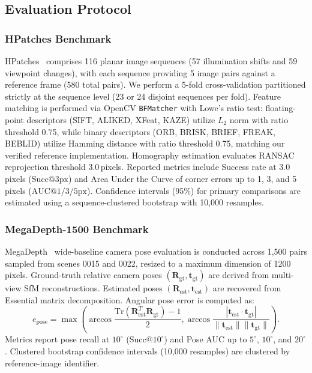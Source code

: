 \documentclass[conference]{IEEEtran}
\begin{document}
\subsection{Evaluation Protocol}
\subsubsection{HPatches Benchmark}
HPatches~\cite{balntas2017hpatches} comprises 116 planar image sequences (57 illumination shifts and 59 viewpoint changes), with each sequence providing 5 image pairs against a reference frame (580 total pairs). We perform a 5-fold cross-validation partitioned strictly at the sequence level (23 or 24 disjoint sequences per fold). Feature matching is performed via OpenCV \texttt{BFMatcher} with Lowe's ratio test: floating-point descriptors (SIFT, ALIKED, XFeat, KAZE) utilize $L_2$ norm with ratio threshold 0.75, while binary descriptors (ORB, BRISK, BRIEF, FREAK, BEBLID) utilize Hamming distance with ratio threshold 0.75, matching our verified reference implementation. Homography estimation evaluates RANSAC reprojection threshold 3.0\,pixels. Reported metrics include Success rate at 3.0\,pixels ($\text{Succ}@3\text{px}$) and Area Under the Curve of corner errors up to 1, 3, and 5 pixels ($\text{AUC}@1/3/5\text{px}$). Confidence intervals (95\%) for primary comparisons are estimated using a sequence-clustered bootstrap with 10,000 resamples.

\subsubsection{MegaDepth-1500 Benchmark}
MegaDepth~\cite{li2018megadepth} wide-baseline camera pose evaluation is conducted across 1,500 pairs sampled from scenes 0015 and 0022, resized to a maximum dimension of 1200 pixels. Ground-truth relative camera poses $(\mathbf{R}_{\text{gt}}, \mathbf{t}_{\text{gt}})$ are derived from multi-view SfM reconstructions. Estimated poses $(\mathbf{R}_{\text{est}}, \mathbf{t}_{\text{est}})$ are recovered from Essential matrix decomposition. Angular pose error is computed as:
\begin{equation}
e_{\text{pose}} = \max\left(\arccos\frac{\mathrm{Tr}(\mathbf{R}_{\text{est}}^T \mathbf{R}_{\text{gt}}) - 1}{2}, \arccos\frac{|\mathbf{t}_{\text{est}} \cdot \mathbf{t}_{\text{gt}}|}{\|\mathbf{t}_{\text{est}}\| \|\mathbf{t}_{\text{gt}}\|}\right).
\end{equation}
Metrics report pose recall at $10^\circ$ ($\text{Succ}@10^\circ$) and Pose AUC up to $5^\circ$, $10^\circ$, and $20^\circ$. Clustered bootstrap confidence intervals (10,000 resamples) are clustered by reference-image identifier.
\end{document}
